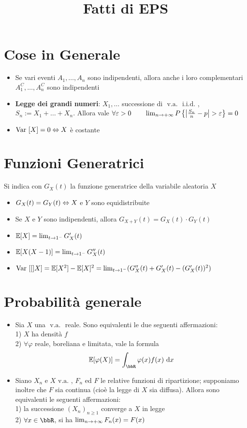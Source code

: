 \documentclass[a4paper, NoNotes, GeneralMath]{stdmdoc}
\newcommand{\E}[1]{\mathbb{E}[{#1}]}
\newcommand{\Var}[1]{\mbox{Var }[{#1}]}
\newcommand{\va}{\mbox{ v.a. }}
\newcommand{\iid}{\mbox{ i.i.d. }}
\begin{document}
	\title{Fatti di EPS}
	\autodate

	\section*{Cose in Generale}
	\begin{itemize}
		\item Se vari eventi $A_1, \ldots, A_n$ sono indipendenti, allora anche i loro complementari $A_1^C, \ldots, A_n^C$ sono indipendenti
		\item {\bf Legge dei grandi numeri}: $X_1, \ldots$ successione di $\va \iid$, $S_n := X_1 + \ldots + X_n$. Allora vale $\forall \varepsilon > 0 \qquad \lim_{n\rightarrow +\infty} P\left\{ \left| \frac{S_n}{n} - p \right| > \varepsilon \right\} = 0$
		\item $\Var{X} = 0 \sse X $ è costante
	\end{itemize}

	\section*{Funzioni Generatrici}
	Si indica con $G_X(t)$ la funzione generatrice della variabile aleatoria $X$
	\begin{itemize}
		\item $G_X(t) = G_Y(t) \Leftrightarrow X$ e $Y$ sono equidistribuite
		\item Se $X$ e $Y$ sono indipendenti, allora $G_{X+Y}(t) = G_X(t)\cdot G_Y(t)$
		\item $\E{X} = \lim_{t\rar 1^{-}} G_X'(t)$
		\item $\E{X(X-1)} = \lim_{t\rar 1^{-}} G_X''(t)$
		\item $\Var[X] = \E{X^2} - \E{X}^2 = \lim_{t\rar 1^{-}} (G_X''(t) + G_X'(t) - (G_X'(t))^2)$
	\end{itemize}

	\section*{Probabilità generale}
	\begin{itemize}
		\item Sia $X$ una $\va$ reale. Sono equivalenti le due seguenti affermazioni: \\ 1) $X$ ha densità $f$ \\ 2) $\forall \varphi$ reale, boreliana e limitata, vale la formula $$ \E{\varphi(X)} = \int_{\bbR} \varphi(x) f(x) \de{x} $$
		\item Siano $X_n$ e $X \va$, $F_n$ ed $F$ le relative funzioni di ripartizione; supponiamo inoltre che $F$ sia continua (cioè la legge di $X$ sia diffusa). Allora sono equivalenti le seguenti affermazioni: \\ 1) la successione ${(X_n)}_{n\ge 1}$ converge a $X$ in legge \\ 2) $\forall x \in \bbR$, si ha $\lim_{n\rightarrow +\infty} F_n(x) = F(x)$
	\end{itemize}
	
\end{document}
